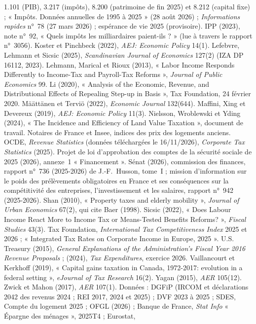 \documentclass[11pt,a4paper]{article}
\begin{document}
{1.101 (PIB), 3.217 (impôts), 8.200 (patrimoine de fin 2025) et 8.212 (capital fixe) ; « Impôts. Données annuelles de
1995 à 2025 » (28 août 2026) ; \emph{Informations rapides} n°~78 (27 mars 2026) ; espérance de vie 2025 (provisoire).
IPP (2023), note n°~92, « Quels impôts les milliardaires paient-ils ? » (lue à travers le rapport n°~3056).
Koster et Pinchbeck (2022), \emph{AEJ: Economic Policy} 14(1).
Lefebvre, Lehmann et Sicsic (2025), \emph{Scandinavian Journal of Economics} 127(2) (IZA DP 16112, 2023).
Lehmann, Marical et Rioux (2013), « Labor Income Responds Differently to Income-Tax and Payroll-Tax Reforms »,
\emph{Journal of Public Economics} 99.
Li (2020), « Analysis of the Economic, Revenue, and Distributional Effects of Repealing Step-up in Basis », Tax
Foundation, 24 février 2020.
Määttänen et Terviö (2022), \emph{Economic Journal} 132(644).
Maffini, Xing et Devereux (2019), \emph{AEJ: Economic Policy} 11(3).
Nielsson, Wroblewski et Yding (2024), « The Incidence and Efficiency of Land Value Taxation », document de
travail.
Notaires de France et Insee, indices des prix des logements anciens.
OCDE, \emph{Revenue Statistics} (données téléchargées le 16/11/2026), \emph{Corporate Tax Statistics} (2025).
Projet de loi d'approbation des comptes de la sécurité sociale de 2025 (2026), annexe~1 « Financement ».
Sénat (2026), commission des finances, rapport n°~736 (2025-2026) de J.-F.~Husson, tome~I ; mission d'information sur le poids des prélèvements obligatoires en France et ses conséquences sur
la compétitivité des entreprises, l'investissement et les salaires, rapport n°~942 (2025-2026).
Shan (2010), « Property taxes and elderly mobility », \emph{Journal of Urban Economics} 67(2), qui cite Baer (1998).
Sicsic (2022), « Does Labour Income React More to Income Tax or Means-Tested Benefits Reforms? », \emph{Fiscal
Studies} 43(3).
Tax Foundation, \emph{International Tax Competitiveness Index} 2025 et 2026 ; « Integrated Tax Rates on Corporate
Income in Europe, 2025 ».
U.S. Treasury (2015), \emph{General Explanations of the Administration's Fiscal Year 2016 Revenue Proposals} ; (2024),
\emph{Tax Expenditures}, exercice 2026.
Vaillancourt et Kerkhoff (2019), « Capital gains taxation in Canada, 1972-2017: evolution in a federal setting »,
\emph{eJournal of Tax Research} 16(2).
Yagan (2015), \emph{AER} 105(12).
Zwick et Mahon (2017), \emph{AER} 107(1).
Données : DGFiP (IRCOM et déclarations 2042 des revenus 2024 ; REI 2017, 2024 et 2025) ; DVF 2023 à 2025 ; SDES,
Compte du logement 2025 ; OFGL (2026) ; Banque de France, \emph{Stat Info} « Épargne des ménages », 2025T4 ; Eurostat,
}
\end{document}
